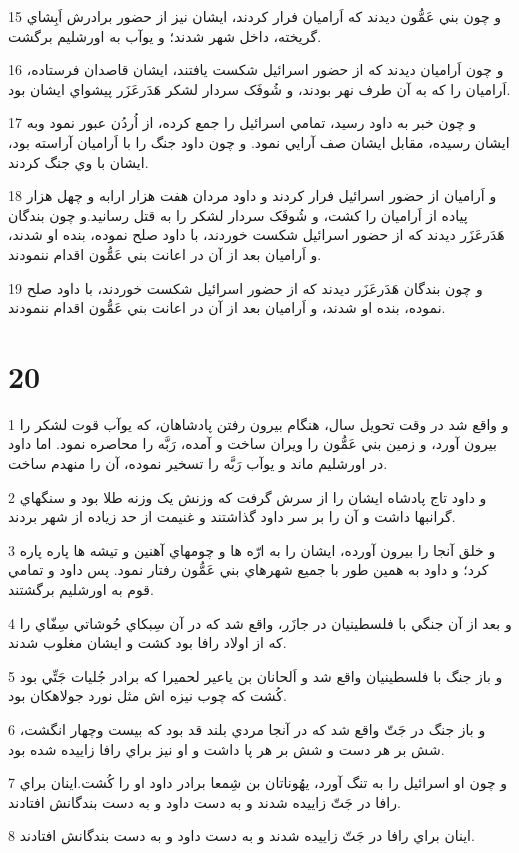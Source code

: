 \par 15 و چون بني عَمُّون ديدند که اَراميان فرار کردند، ايشان نيز از حضور برادرش اَبِشاي گريخته، داخل شهر شدند؛ و يوآب به اورشليم برگشت.
\par 16 و چون اَراميان ديدند که از حضور اسرائيل شکست يافتند، ايشان قاصدان فرستاده، اَراميان را که به آن طرف نهر بودند، و شُوفَک سردار لشکر هَدَرعَزَر پيشواي ايشان بود.
\par 17 و چون خبر به داود رسيد، تمامي اسرائيل را جمع کرده، از اُردُن عبور نمود وبه ايشان رسيده، مقابل ايشان صف آرايي نمود. و چون داود جنگ را با اَراميان آراسته بود، ايشان با وي جنگ کردند.
\par 18 و اَراميان از حضور اسرائيل فرار کردند و داود مردان هفت هزار ارابه و چهل هزار پياده از اَراميان را کشت، و شُوفَک سردار لشکر را به قتل رسانيد.و چون بندگان هَدَرعَزَر ديدند که از حضور اسرائيل شکست خوردند، با داود صلح نموده، بنده او شدند، و اَراميان بعد از آن در اعانت بني عَمُّون اقدام ننمودند.
\par 19 و چون بندگان هَدَرعَزَر ديدند که از حضور اسرائيل شکست خوردند، با داود صلح نموده، بنده او شدند، و اَراميان بعد از آن در اعانت بني عَمُّون اقدام ننمودند.
 
\chapter{20}

\par 1 و واقع شد در وقت تحويل سال، هنگام بيرون رفتن پادشاهان، که يوآب قوت لشکر را بيرون آورد، و زمين بني عَمُّون را ويران ساخت و آمده، رَبَّه را محاصره نمود. اما داود در اورشليم ماند و يوآب رَبَّه را تسخير نموده، آن را منهدم ساخت.
\par 2 و داود تاج پادشاه ايشان را از سرش گرفت که وزنش يک وزنه طلا بود و سنگهاي گرانبها داشت و آن را بر سر داود گذاشتند و غنيمت از حد زياده از شهر بردند.
\par 3 و خلق آنجا را بيرون آورده، ايشان را به ارّه ها و چومهاي آهنين و تيشه ها پاره پاره کرد؛ و داود به همين طور با جميع شهرهاي بني عَمُّون رفتار نمود. پس داود و تمامي قوم به اورشليم برگشتند.
\par 4 و بعد از آن جنگي با فلسطينيان در جازَر، واقع شد که در آن سِبکاي حُوشاتي سِفّاي را که از اولاد رافا بود کشت و ايشان مغلوب شدند.
\par 5 و باز جنگ با فلسطينيان واقع شد و اَلحانان بن ياعير لحميرا که برادر جُليات جَتِّي بود کُشت که چوب نيزه اش مثل نورد جولاهکان بود.
\par 6 و باز جنگ در جَتّ واقع شد که در آنجا مردي بلند قد بود که بيست وچهار انگشت، شش بر هر دست و شش بر هر پا داشت و او نيز براي رافا زاييده شده بود.
\par 7 و چون او اسرائيل را به تنگ آورد، يهُوناتان بن شِمعا برادر داود او را کُشت.اينان براي رافا در جَتّ زاييده شدند و به دست داود و به دست بندگانش افتادند.
\par 8 اينان براي رافا در جَتّ زاييده شدند و به دست داود و به دست بندگانش افتادند.
 
